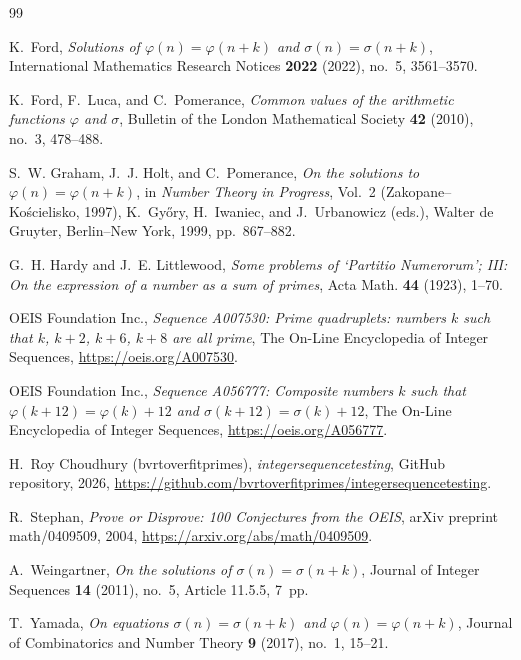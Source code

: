 \documentclass[12pt, twoside]{amsart}
\theoremstyle{definition}
\begin{document}
\medskip
\begin{thebibliography}{99}

K.~Ford,
\emph{Solutions of $\varphi(n)=\varphi(n+k)$ and
$\sigma(n)=\sigma(n+k)$},
International Mathematics Research Notices
\textbf{2022} (2022), no.~5, 3561--3570.

K.~Ford, F.~Luca, and C.~Pomerance,
\emph{Common values of the arithmetic functions
$\varphi$ and $\sigma$},
Bulletin of the London Mathematical Society
\textbf{42} (2010), no.~3, 478--488.

S.~W. Graham, J.~J. Holt, and C.~Pomerance,
\emph{On the solutions to $\varphi(n)=\varphi(n+k)$},
in \emph{Number Theory in Progress},
Vol.~2 (Zakopane--Ko\'scielisko, 1997),
K.~Gy{\H{o}}ry, H.~Iwaniec, and J.~Urbanowicz (eds.),
Walter de Gruyter, Berlin--New York, 1999, pp.~867--882.

G.~H. Hardy and J.~E. Littlewood,
\emph{Some problems of `Partitio Numerorum'; III:
On the expression of a number as a sum of primes},
Acta Math. \textbf{44} (1923), 1--70.

OEIS Foundation Inc.,
\emph{Sequence A007530: Prime quadruplets: numbers $k$
such that $k$, $k+2$, $k+6$, $k+8$ are all prime},
The On-Line Encyclopedia of Integer Sequences,
\url{https://oeis.org/A007530}.

OEIS Foundation Inc.,
\emph{Sequence A056777: Composite numbers $k$ such that
$\varphi(k+12)=\varphi(k)+12$ and
$\sigma(k+12)=\sigma(k)+12$},
The On-Line Encyclopedia of Integer Sequences,
\url{https://oeis.org/A056777}.

H.~Roy Choudhury (bvrtoverfitprimes),
\emph{integersequencetesting},
GitHub repository, 2026,
\url{https://github.com/bvrtoverfitprimes/integersequencetesting}.

R.~Stephan,
\emph{Prove or Disprove: 100 Conjectures from the OEIS},
arXiv preprint math/0409509, 2004,
\url{https://arxiv.org/abs/math/0409509}.

A.~Weingartner,
\emph{On the solutions of $\sigma(n)=\sigma(n+k)$},
Journal of Integer Sequences
\textbf{14} (2011), no.~5, Article 11.5.5, 7~pp.

T.~Yamada,
\emph{On equations $\sigma(n)=\sigma(n+k)$ and
$\varphi(n)=\varphi(n+k)$},
Journal of Combinatorics and Number Theory
\textbf{9} (2017), no.~1, 15--21.

\end{thebibliography}
\end{document}

